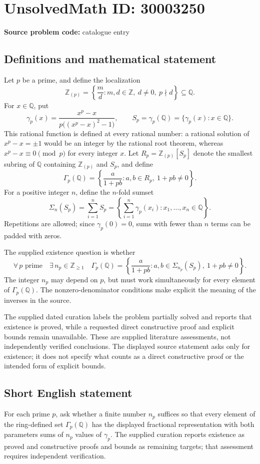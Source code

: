 \documentclass[11pt]{article}
\newcommand{\Z}{\mathbb{Z}}
\newcommand{\Q}{\mathbb{Q}}
\begin{document}
\section*{UnsolvedMath ID: 30003250}
\textbf{Source problem code:} catalogue entry
\subsection{Definitions and mathematical statement}
Let \(p\) be a prime, and define the localization
\[
\Z_{(p)}=\left\{\frac{m}{d}:m,d\in\Z,\ d\ne0,\ p\nmid d\right\}\subseteq\Q.
\]
For \(x\in\Q\), put
\[
\gamma_p(x)=\frac{x^p-x}{p\bigl((x^p-x)^2-1\bigr)},
\qquad
S_p=\gamma_p(\Q)=\{\gamma_p(x):x\in\Q\}.
\]
This rational function is defined at every rational number: a rational solution of \(x^p-x=\pm1\) would be an integer by the rational root theorem, whereas \(x^p-x\equiv0\pmod p\) for every integer \(x\).
Let \(R_p=\Z_{(p)}[S_p]\) denote the smallest subring of \(\Q\) containing \(\Z_{(p)}\) and \(S_p\), and define
\[
\Gamma_p(\Q)=\left\{\frac{a}{1+pb}:a,b\in R_p,\ 1+pb\ne0\right\}.
\]
For a positive integer \(n\), define the \(n\)-fold sumset
\[
\Sigma_n(S_p)=\sum_{i=1}^{n}S_p
=\left\{\sum_{i=1}^{n}\gamma_p(x_i):x_1,\ldots,x_n\in\Q\right\}.
\]
Repetitions are allowed; since \(\gamma_p(0)=0\), sums with fewer than \(n\) terms can be padded with zeros.

The supplied existence question is whether
\[
\forall\,p\text{ prime}\quad\exists\,n_p\in\Z_{\ge1}\quad
\Gamma_p(\Q)
=\left\{\frac{a}{1+pb}:a,b\in\Sigma_{n_p}(S_p),\ 1+pb\ne0\right\}.
\]
The integer \(n_p\) may depend on \(p\), but must work simultaneously for every element of \(\Gamma_p(\Q)\). The nonzero-denominator conditions make explicit the meaning of the inverses in the source.

The supplied dated curation labels the problem partially solved and reports that existence is proved, while a requested direct constructive proof and explicit bounds remain unavailable. These are supplied literature assessments, not independently verified conclusions. The displayed source statement asks only for existence; it does not specify what counts as a direct constructive proof or the intended form of explicit bounds.
\subsection{Short English statement}
For each prime \(p\), ask whether a finite number \(n_p\) suffices so that every element of the ring-defined set \(\Gamma_p(\Q)\) has the displayed fractional representation with both parameters sums of \(n_p\) values of \(\gamma_p\). The supplied curation reports existence as proved and constructive proofs and bounds as remaining targets; that assessment requires independent verification.
\end{document}
